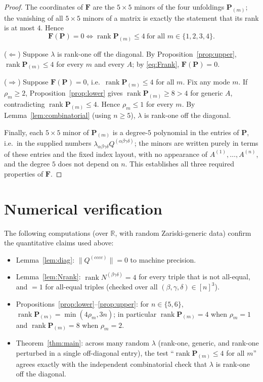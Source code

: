 \documentclass[12pt]{article}
\DeclareMathOperator{\rank}{rank}
\newcommand{\bR}{\mathbb{R}}
\theoremstyle{definition}
\begin{document}
\begin{proof}
The coordinates of $\mathbf F$ are the $5\times5$ minors of the four unfoldings
$\mathbf P_{(m)}$; the vanishing of all $5\times5$ minors of a matrix is exactly the
statement that its rank is at most $4$.  Hence
\begin{equation}\label{eq:Frank}
\mathbf F(\mathbf P)=0
\iff
\rank\mathbf P_{(m)}\le4\ \text{for all }m\in\{1,2,3,4\}.
\end{equation}

($\Leftarrow$) Suppose $\lambda$ is rank-one off the diagonal.  By
Proposition~\ref{prop:upper}, $\rank\mathbf P_{(m)}\le4$ for every $m$ and every
$A$; by \eqref{eq:Frank}, $\mathbf F(\mathbf P)=0$.

($\Rightarrow$) Suppose $\mathbf F(\mathbf P)=0$, i.e.\ $\rank\mathbf P_{(m)}\le4$ for
all $m$.  Fix any mode $m$.  If $\rho_m\ge2$, Proposition~\ref{prop:lower} gives
$\rank\mathbf P_{(m)}\ge8>4$ for generic $A$, contradicting $\rank\mathbf P_{(m)}\le4$.
Hence $\rho_m\le1$ for every $m$.  By Lemma~\ref{lem:combinatorial} (using $n\ge5$),
$\lambda$ is rank-one off the diagonal.

Finally, each $5\times5$ minor of $\mathbf P_{(m)}$ is a degree-$5$ polynomial in the
entries of $\mathbf P$, i.e.\ in the supplied numbers
$\lambda_{\alpha\beta\gamma\delta}Q^{(\alpha\beta\gamma\delta)}$; the minors are
written purely in terms of these entries and the fixed index layout, with no
appearance of $A^{(1)},\dots,A^{(n)}$, and the degree $5$ does not depend on $n$.
This establishes all three required properties of $\mathbf F$.
\end{proof}

\section{Numerical verification}

The following computations (over $\bR$, with random Zariski-generic data) confirm the
quantitative claims used above:
\begin{itemize}
\item Lemma~\ref{lem:diag}: $\|Q^{(cccc)}\|=0$ to machine precision.
\item Lemma~\ref{lem:Nrank}: $\rank N^{(\beta\gamma\delta)}=4$ for every triple that
is not all-equal, and $=1$ for all-equal triples (checked over all
$(\beta,\gamma,\delta)\in[n]^3$).
\item Propositions~\ref{prop:lower}--\ref{prop:upper}: for $n\in\{5,6\}$,
$\rank\mathbf P_{(m)}=\min(4\rho_m,3n)$; in particular $\rank\mathbf P_{(m)}=4$ when
$\rho_m=1$ and $\rank\mathbf P_{(m)}=8$ when $\rho_m=2$.
\item Theorem~\ref{thm:main}: across many random $\lambda$ (rank-one, generic, and
rank-one perturbed in a single off-diagonal entry), the test
``$\rank\mathbf P_{(m)}\le4$ for all $m$'' agrees exactly with the independent
combinatorial check that $\lambda$ is rank-one off the diagonal.
\end{itemize}
\end{document}
